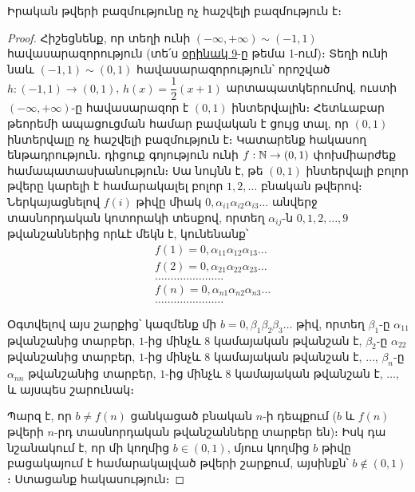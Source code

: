 \documentclass[./main.tex]{subfiles}
\begin{document}
\begin{theorem}\label{ch3thm6}
Իրական թվերի բազմությունը ոչ հաշվելի բազմություն է։
\end{theorem}
\begin{proof}
Հիշեցնենք, որ տեղի ունի $(-\infty,+\infty) \sim (-1,1)$ հավա\-սա\-րա\-զո\-րու\-թյուն (տե՛ս \hyperref[ch1ex9]{օրինակ 9}-ը թեմա 1-ում)։ Տեղի ունի նաև $(-1,1) \sim (0,1)$ հավա\-սա\-րա\-զո\-րու\-թյուն՝ որոշված $h:(-1,1)\rightarrow (0,1)$, $h(x)=\dfrac{1}{2}(x+1)$ արտապատկերումով, ուստի $(-\infty,+\infty)$-ը հավասարազոր է $(0,1)$ ինտերվալին։ Հետևաբար թեորեմի ապա\-ցուց\-ման համար բավական է ցույց տալ, որ $(0,1)$ ինտերվալը ոչ հաշվելի բազմություն է։ Կատարենք հակասող ենթադրու\-թյուն․ դիցուք գոյություն ունի $f:\mathbb{N} \rightarrow (0,1)$ փոխ\-մի\-ար\-ժեք համապատասխանություն։ Սա նույնն է, թե $(0,1)$ ինտերվալի բոլոր թվերը կարելի է համարակալել բոլոր $1,2,\dots$ բնական թվերով։ Ներկայացնելով $f(i)$ թիվը միակ $0{,}\alpha_{i1} \alpha_{i2} \alpha_{i3}\dots$ անվերջ տասնորդական կոտորակի տեսքով, որտեղ $\alpha_{ij}$-ն $0,1,2,\dots,9$ թվանշաններից որևէ մեկն է, կունենանք՝
\begin{align*}
&f(1)=0{,}\alpha_{11} \alpha_{12} \alpha_{13} \dots\\
&f(2)=0{,}\alpha_{21} \alpha_{22} \alpha_{23} \dots \\
&\dots\dots\dots\dots\dots\dots\dots.\\
&f(n)=0{,}\alpha_{n1} \alpha_{n2} \alpha_{n3} \dots\\
&\dots\dots\dots\dots\dots\dots\dots.
\end{align*}
\par Օգտվելով այս շարքից՝ կազմենք մի $b=0{,}\beta_1\beta_2\beta_3\dots$ թիվ, որտեղ $\beta_{1}$-ը $\alpha_{11}$ թվանշանից տարբեր, $1$-ից մինչև $8$ կամայական թվանշան է, $\beta_{2}$-ը $\alpha_{22}$ թվանշանից տարբեր, $1$-ից մինչև $8$ կամայական թվանշան է, $\dots$, $\beta_{n}$-ը $\alpha_{nn}$ թվանշանից տարբեր, $1$-ից մինչև $8$ կամայական թվանշան է, $\dots$, և այսպես շարունակ։
\par Պարզ է, որ $b \neq f(n)$ ցանկացած բնական $n$-ի դեպքում ($b$ և $f(n)$ թվերի $n$-րդ տասնորդական թվանշանները տարբեր են)։ Իսկ դա նշանակում է, որ մի կողմից ${b \in (0,1)}$, մյուս կողմից $b$ թիվը բացակայում է համարակալված թվերի շարքում, այսինքն՝ $b \not\in (0,1)$։ Ստացանք հակասություն։
\end{proof}
\end{document}
